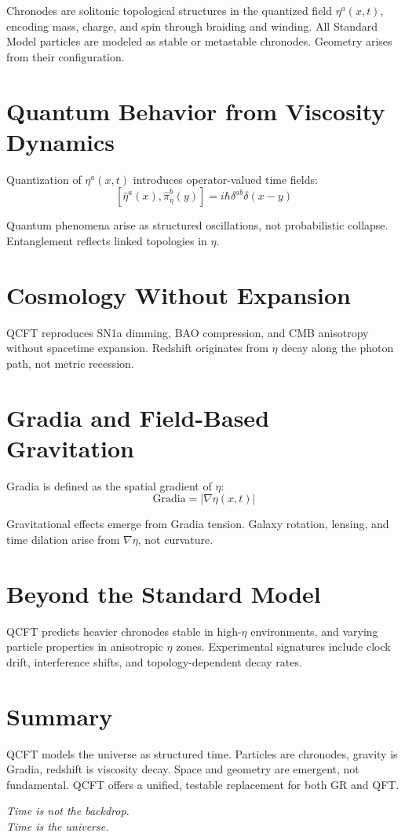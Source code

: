 \documentclass[12pt]{article}
\begin{document}
Chronodes are solitonic topological structures in the quantized field $\eta^a(x,t)$, encoding mass, charge, and spin through braiding and winding. All Standard Model particles are modeled as stable or metastable chronodes. Geometry arises from their configuration.

\section{Quantum Behavior from Viscosity Dynamics}

Quantization of $\eta^a(x,t)$ introduces operator-valued time fields:
\[
[\hat{\eta}^a(x), \hat{\pi}_\eta^b(y)] = i \hbar \delta^{ab} \delta(x - y)
\]

Quantum phenomena arise as structured oscillations, not probabilistic collapse. Entanglement reflects linked topologies in $\eta$.

\section{Cosmology Without Expansion}

QCFT reproduces SN1a dimming, BAO compression, and CMB anisotropy without spacetime expansion. Redshift originates from $\eta$ decay along the photon path, not metric recession.

\section{Gradia and Field-Based Gravitation}

Gradia is defined as the spatial gradient of $\eta$:
\[
\text{Gradia} = |\nabla \eta(x,t)|
\]

Gravitational effects emerge from Gradia tension. Galaxy rotation, lensing, and time dilation arise from $\nabla \eta$, not curvature.

\section{Beyond the Standard Model}

QCFT predicts heavier chronodes stable in high-$\eta$ environments, and varying particle properties in anisotropic $\eta$ zones. Experimental signatures include clock drift, interference shifts, and topology-dependent decay rates.

\section*{Summary}

QCFT models the universe as structured time. Particles are chronodes, gravity is Gradia, redshift is viscosity decay. Space and geometry are emergent, not fundamental. QCFT offers a unified, testable replacement for both GR and QFT.

\begin{center}
\emph{Time is not the backdrop.\\
Time is the universe.}
\end{center}
\end{document}
